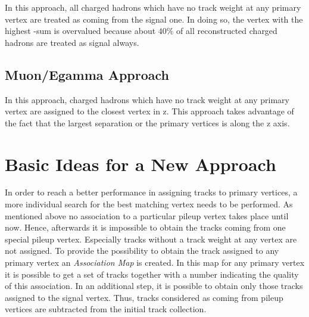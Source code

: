In this approach, all charged hadrons which have no track weight at any primary vertex are treated as coming from the signal one. In doing so, the vertex with the highest \pt-sum is overvalued because about $40\%$ of all reconstructed charged hadrons are treated as signal always.

\subsection{Muon/Egamma Approach \label{sec:IntroME}}

In this approach, charged hadrons which have no track weight at any primary vertex are assigned to the closest vertex in z. This approach takes advantage of the fact that the largest separation or the primary vertices is along the z axis. 

\section{Basic Ideas for a New Approach}

In order to reach a better performance in assigning tracks to primary vertices, a more individual search for the best matching vertex needs to be performed. As mentioned above no association to a particular pileup vertex takes place until now. Hence, afterwards it is impossible to obtain the tracks coming from one special pileup vertex. Especially tracks without a track weight at any vertex are not assigned. To provide the possibility to obtain the track assigned to any primary vertex an \textit{Association Map} is created. In this map for any primary vertex it is possible to get a set of tracks together with a number indicating the quality of this association. In an additional step, it is possible to obtain only those tracks assigned to the signal vertex. Thus, tracks considered as coming from pileup vertices are subtracted from the initial track collection.